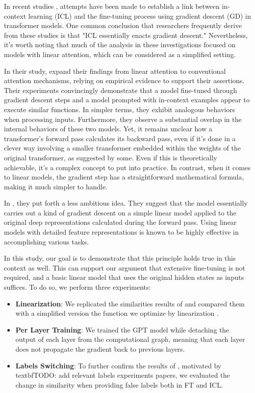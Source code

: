 In recent studies \cite{pmlr-v202-von-oswald23a,dai2023gpt}, attempts have been made to establish a link between in-context learning (ICL) and the fine-tuning process using gradient descent (GD) in transformer models. One common conclusion that researchers frequently derive from these studies is that "ICL essentially enacts gradient descent." Nevertheless, it's worth noting that much of the analysis in these investigations focused on models with linear attention, which can be considered as a simplified setting.

In their study, \cite{dai2023gpt} expand their findings from linear attention to conventional attention mechanisms, relying on empirical evidence to support their assertions.
Their experiments convincingly demonstrate that a model fine-tuned through gradient descent steps and a model prompted with in-context examples appear to execute similar functions. In simpler terms, they exhibit analogous behaviors when processing inputs. Furthermore, they observe a substantial overlap in the internal behaviors of these two models.
Yet, it remains unclear how a transformer's forward pass calculates its backward pass, even if it's done in a clever way involving a smaller transformer embedded within the weights of the original transformer, as suggested by some. Even if this is theoretically achievable, it's a complex concept to put into practice. In contrast, when it comes to linear models, the gradient step has a straightforward mathematical formula, making it much simpler to handle.

In \cite{pmlr-v202-von-oswald23a}, they put forth a less ambitious idea. They suggest that the model essentially carries out a kind of gradient descent on a simple linear model applied to the original deep representations calculated during the forward pass.
Using linear models with detailed feature representations is known to be highly effective in accomplishing various tasks.


In this study, our goal is to demonstrate that this principle holds true in this context as well. This can support our argument that extensive fine-tuning is not required, and a basic linear model that uses the original hidden states as inputs suffices.
To do so, we perform three experiments:
\begin{itemize}
    \item \textbf{Linearization}: We replicated the similarities results of \cite{dai2023gpt} and compared them with a simplified version the function we optimize by linearization \cite{linearization23}.
    \item \textbf{Per Layer Training}: We trained the GPT model while detaching the output of each layer from the computational graph, meaning that each layer does not propagate the gradient back to previous layers.
    \item \textbf{Labels Switching}: To further confirm the results of \cite{dai2023gpt}, motivated by textbf{TODO: add relevant labels experiments papers}, we evaluated the change in similarity when providing false labels both in FT and ICL.
\end{itemize}
